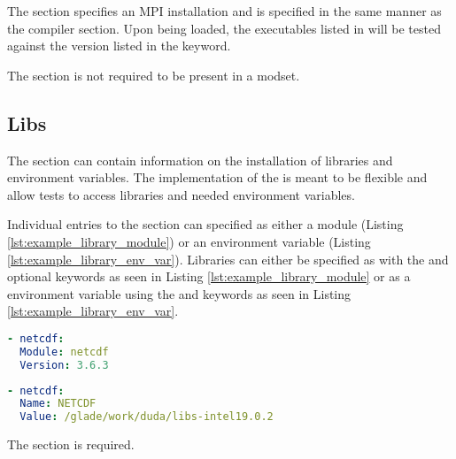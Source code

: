The \mpi section specifies an MPI installation and is specified in the same
manner as the compiler section. Upon being loaded, the executables listed in
\executables will be tested against the version listed in the \version keyword.

The \mpi section is not required to be present in a modset.

\subsection{Libs}
\label{subsec:modset_libs}

The \libs section can contain information on the installation of libraries and
environment variables. The implementation of the \libs is meant to be flexible
and allow tests to access libraries and needed environment variables.

Individual entries to the \libs section can specified as either a module
(Listing \ref{lst:example_library_module}) or an environment variable (Listing
\ref{lst:example_library_env_var}). Libraries can either be specified as with
the \module and optional \version keywords as seen in Listing
\ref{lst:example_library_module} or as a environment variable using the \name
and  keywords as seen in Listing \ref{lst:example_library_env_var}.

\begin{lstlisting}[language=yaml, 
                   caption={Example Library Module},
                   label={lst:example_library_module}]
- netcdf:
  Module: netcdf
  Version: 3.6.3
\end{lstlisting}

\begin{lstlisting}[language=yaml, 
                   caption={Example Library Environment Variable},
                   label={lst:example_library_env_var}]
- netcdf:
  Name: NETCDF
  Value: /glade/work/duda/libs-intel19.0.2
\end{lstlisting}

The \libs section is required.

